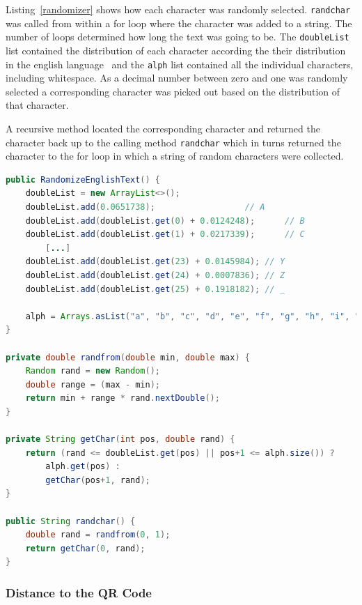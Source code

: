 Listing~\ref{randomizer} shows how each character was randomly selected. \texttt{randchar} was called from within a for loop where the character was added to a string. The number of loops determined how long the text was going to be. The \texttt{doubleList} list contained the distribution of each character according the their distribution in the english language~\cite{englishTextStat} and the \texttt{alph} list contained all the individual characters, including whitespace. As a decimal number between zero and one was randomly selected a corresponding character was picked out based on the distribution of that character.

A recursive method located the corresponding character and returned the character back up to the calling method \texttt{randchar} which in turns returned the character to the for loop in which a string of random characters were collected.

\begin{lstlisting}[language=Java, caption={The randomizer class}, label=randomizer]
public RandomizeEnglishText() {
	doubleList = new ArrayList<>();
	doubleList.add(0.0651738);					// A
	doubleList.add(doubleList.get(0) + 0.0124248);		// B
	doubleList.add(doubleList.get(1) + 0.0217339);		// C
		[...]
	doubleList.add(doubleList.get(23) + 0.0145984);	// Y
	doubleList.add(doubleList.get(24) + 0.0007836);	// Z
	doubleList.add(doubleList.get(25) + 0.1918182);	// _

	alph = Arrays.asList("a", "b", "c", "d", "e", "f", "g", "h", "i", "j", "k", "k", "m", "n", "o", "p", "q", "r", "s", "t", "u", "v", "w", "x", "y", "z", " ");
}

private double randfrom(double min, double max) {
	Random rand = new Random();
	double range = (max - min);
	return min + range * rand.nextDouble();
}

private String getChar(int pos, double rand) {
	return (rand <= doubleList.get(pos) || pos+1 <= alph.size()) ?
		alph.get(pos) :
		getChar(pos+1, rand);
}

public String randchar() {
	double rand = randfrom(0, 1);
	return getChar(0, rand);
}
\end{lstlisting}

\subsubsection{Distance to the QR Code}

